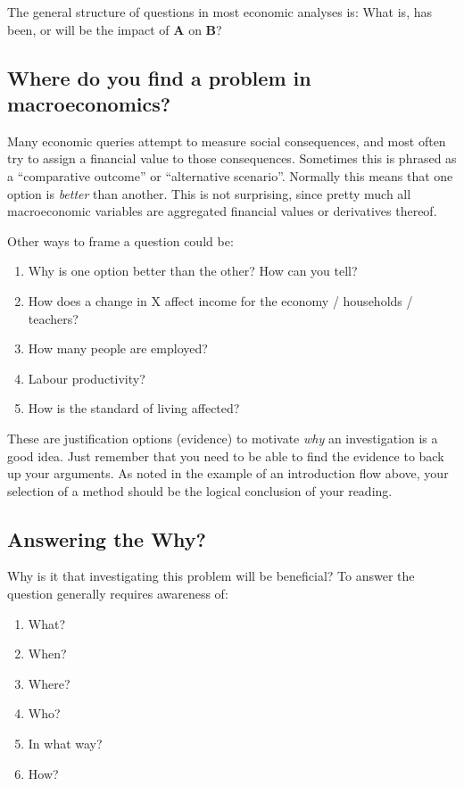 \documentclass[
]{book}
\begin{document}
The general structure of questions in most economic analyses is: What
is, has been, or will be the impact of \textbf{A} on \textbf{B}?

\hypertarget{where-do-you-find-a-problem-in-macroeconomics}{%
\subsection{Where do you find a problem in macroeconomics?}\label{where-do-you-find-a-problem-in-macroeconomics}}

Many economic queries attempt to measure social consequences, and most
often try to assign a financial value to those consequences. Sometimes
this is phrased as a ``comparative outcome'' or ``alternative scenario''.
Normally this means that one option is \emph{better} than another. This is
not surprising, since pretty much all macroeconomic variables are
aggregated financial values or derivatives thereof.

Other ways to frame a question could be:

\begin{enumerate}
\def\labelenumi{\arabic{enumi}.}
\item
  Why is one option better than the other? How can you tell?
\item
  How does a change in X affect income for the economy / households /
  teachers?
\item
  How many people are employed?
\item
  Labour productivity?
\item
  How is the standard of living affected?
\end{enumerate}

These are justification options (evidence) to motivate \emph{why} an
investigation is a good idea. Just remember that you need to be able to
find the evidence to back up your arguments. As noted in the example of
an introduction flow above, your selection of a method should be the
logical conclusion of your reading.

\hypertarget{answering-the-why}{%
\subsection{Answering the Why?}\label{answering-the-why}}

Why is it that investigating this problem will be beneficial? To answer
the question generally requires awareness of:

\begin{enumerate}
\def\labelenumi{\arabic{enumi}.}
\item
  What?
\item
  When?
\item
  Where?
\item
  Who?
\item
  In what way?
\item
  How?
\end{enumerate}
\end{document}
